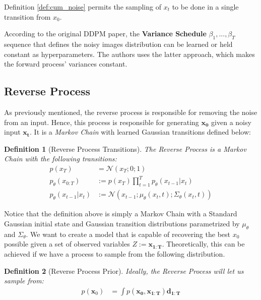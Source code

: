 \documentclass{article}
\newtheorem{definition}{Definition}[section]
\begin{document}
Definition \ref{def:cum_noise} permits the sampling of $x_t$ to be done in a single transition from $x_0$.

According to the original DDPM paper, the \textbf{Variance Schedule} $\beta_1, ..., \beta_T$ sequence that defines the noisy images distribution can be learned or held constant as hyperparameters. The authors uses the latter approach, which makes the forward process' variances constant.

\subsection{Reverse  Process}

As previously mentioned, the reverse process is responsible for removing the noise from an input. Hence, this process is responsible for generating $\mathbf{x_0}$ given a noisy input $\mathbf{x_t}$. It is a \textit{Markov Chain} with learned Gaussian transitions defined below:


\begin{definition}[Reverse Process Transitions]
	The Reverse Process is a Markov Chain with the following transitions:
	\label{def:rev_process_trans}
	\begin{align}
		p(x_T) &= \mathcal{N}(x_T; 0; 1)\\
	    p_{\theta}(x_{0:T}) &:= p(x_T) \prod_{t=1}^{T} p_{\theta}(x_{t-1} | x_t) \\
	 	p_{\theta}(x_{t-1} | x_t) & := \mathcal{N}(x_{t-1}; \mu_\theta(x_t,t); \Sigma_\theta(x_t, t))
	\end{align}
\end{definition}

Notice that the definition above is simply a Markov Chain with a Standard Gaussian initial state and Gaussian transition distributions parametrized by $\mu_\theta$ and $\Sigma_\theta$. We want to create a model that is capable of recovering the best $x_0$ possible given a set of observed variables $Z := \mathbf{x_{1:T}}$. Theoretically, this can be achieved if we have a process to sample from the following distribution.

\begin{definition}[Reverse Process Prior]
	Ideally, the Reverse Process will let us sample from:
	\label{def:rev_process_post}
	\begin{align}
		p(\mathbf{x}_0) &=  \int p(\mathbf{x_0}, \mathbf{x_{1:T}})\mathbf{d_{1:T}} \\
	\end{align}
\end{definition}
\end{document}
